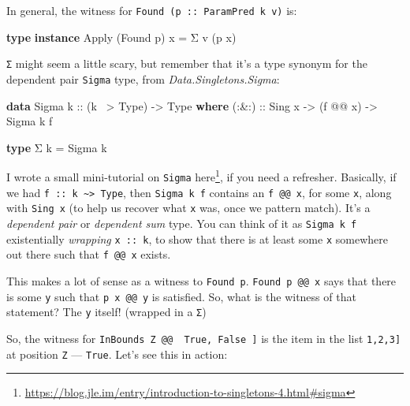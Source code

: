 \documentclass[]{article}
\newenvironment{Shaded}{}{}
\newcommand{\DataTypeTok}[1]{\textcolor[rgb]{0.56,0.13,0.00}{#1}}
\newcommand{\FunctionTok}[1]{\textcolor[rgb]{0.02,0.16,0.49}{#1}}
\newcommand{\KeywordTok}[1]{\textcolor[rgb]{0.00,0.44,0.13}{\textbf{#1}}}
\newcommand{\NormalTok}[1]{#1}
\newcommand{\OtherTok}[1]{\textcolor[rgb]{0.00,0.44,0.13}{#1}}
\renewcommand{\href}[2]{#2\footnote{\url{#1}}}
\begin{document}
In general, the witness for \texttt{Found\ (p\ ::\ ParamPred\ k\ v)} is:

\begin{Shaded}
\begin{Highlighting}[]
\KeywordTok{type} \KeywordTok{instance} \DataTypeTok{Apply}\NormalTok{ (}\DataTypeTok{Found}\NormalTok{ p) x }\FunctionTok{=}\NormalTok{ Σ v (p x)}
\end{Highlighting}
\end{Shaded}

\texttt{Σ} might seem a little scary, but remember that it's a type synonym for
the dependent pair \texttt{Sigma} type, from \emph{Data.Singletons.Sigma}:

\begin{Shaded}
\begin{Highlighting}[]
\KeywordTok{data} \DataTypeTok{Sigma}\OtherTok{ k ::}\NormalTok{ (k }\FunctionTok{~>} \DataTypeTok{Type}\NormalTok{) }\OtherTok{->} \DataTypeTok{Type} \KeywordTok{where}
\OtherTok{    (:&:) ::} \DataTypeTok{Sing}\NormalTok{ x }\OtherTok{->}\NormalTok{ (f }\FunctionTok{@@}\NormalTok{ x) }\OtherTok{->} \DataTypeTok{Sigma}\NormalTok{ k f}

\KeywordTok{type}\NormalTok{ Σ k }\FunctionTok{=} \DataTypeTok{Sigma}\NormalTok{ k}
\end{Highlighting}
\end{Shaded}

I wrote a small mini-tutorial on \texttt{Sigma}
\href{https://blog.jle.im/entry/introduction-to-singletons-4.html\#sigma}{here},
if you need a refresher. Basically, if we had
\texttt{f\ ::\ k\ \textasciitilde{}\textgreater{}\ Type}, then
\texttt{Sigma\ k\ f} contains an \texttt{f\ @@\ x}, for some \texttt{x}, along
with \texttt{Sing\ x} (to help us recover what \texttt{x} was, once we pattern
match). It's a \emph{dependent pair} or \emph{dependent sum} type. You can think
of it as \texttt{Sigma\ k\ f} existentially \emph{wrapping} \texttt{x\ ::\ k},
to show that there is at least some \texttt{x} somewhere out there such that
\texttt{f\ @@\ x} exists.

This makes a lot of sense as a witness to \texttt{Found\ p}.
\texttt{Found\ p\ @@\ x} says that there is some \texttt{y} such that
\texttt{p\ x\ @@\ y} is satisfied. So, what is the witness of that statement?
The \texttt{y} itself! (wrapped in a \texttt{Σ})

So, the witness for
\texttt{InBounds\ \textquotesingle{}Z\ @@\ \textquotesingle{}{[}\ \textquotesingle{}True,\ \textquotesingle{}False\ {]}}
is the item in the list \texttt{\textquotesingle{}{[}1,2,3{]}} at position
\texttt{\textquotesingle{}Z} --- \texttt{\textquotesingle{}True}. Let's see this
in action:
\end{document}
